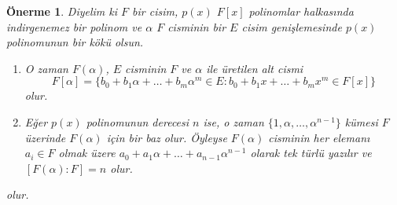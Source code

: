 \documentclass[draft]{article}
\newtheorem{prop}[thm]{Önerme}
\theoremstyle{definition}
\theoremstyle{remark}
\begin{document}
			\begin{prop}
			    Diyelim ki $F$ bir cisim, $p(x)$ $F[x]$ polinomlar halkasında indirgenemez bir polinom ve $\alpha$ $F$ cisminin bir $E$ cisim genişlemesinde $p(x)$ polinomunun bir kökü olsun.
				\begin{enumerate}
				\renewcommand{\labelenumi}{(\roman{enumi})}
				    \item O zaman $F(\alpha)$, $E$ cisminin $F$ ve $\alpha$ ile üretilen alt cismi
					\begin{equation*}
					    F[\alpha] = \{b_0 + b_1\alpha + \dots + b_{m}\alpha^m \in E : b_0 + b_1x + \dots + b_{m}x^m \in F[x] \}
					\end{equation*}
					olur.
					\item Eğer $p(x)$ polinomunun derecesi $n$ ise, o zaman $\{1, \alpha, \dots, \alpha^{n - 1}\}$ kümesi $F$ üzerinde $F(\alpha)$ için bir baz olur. Öyleyse $F(\alpha)$ cisminin her elemanı $a_i \in F$ olmak üzere $a_0 + a_1\alpha + \dots + a_{n - 1}\alpha^{n - 1}$ olarak tek türlü yazılır ve $[F(\alpha):F] = n$ olur.
				\end{enumerate}
				olur.
			\end{prop}
			
\end{document}
